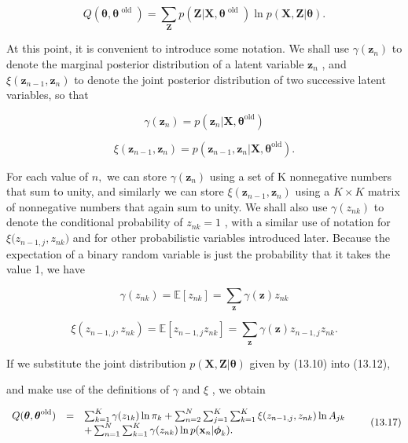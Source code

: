 \documentclass[
  10
]{article}
\begin{document}
\[
Q (\boldsymbol {\theta}, \boldsymbol {\theta} ^ {\text { old }}) = \sum_ {\mathbf {Z}} p (\mathbf {Z} | \mathbf {X}, \boldsymbol {\theta} ^ {\text { old }}) \ln p (\mathbf {X}, \mathbf {Z} | \boldsymbol {\theta}).\tag{13.12}
\]

At this point, it is convenient to introduce some notation. We shall use
\(\gamma ( \mathbf { z } _ { n } )\) to denote the marginal posterior
distribution of a latent variable \(\mathbf { z } _ { n }\) , and
\(\xi ( \mathbf { z } _ { n - 1 } , \mathbf { z } _ { n } )\) to denote
the joint posterior distribution of two successive latent variables, so
that

\[
{\gamma (\mathbf {z} _ {n})} = {p (\mathbf {z} _ {n} | \mathbf {X}, \pmb {\theta} ^ {\mathrm{old}})}\tag{13.13}
\]

\[
\xi (\mathbf {z} _ {n - 1}, \mathbf {z} _ {n}) = p (\mathbf {z} _ {n - 1}, \mathbf {z} _ {n} | \mathbf {X}, \boldsymbol {\theta} ^ {\mathrm{old}}).\tag{13.14}
\]

For each value of \(n ,\) we can store
\(\gamma ( \mathbf { z } _ { n } )\) using a set of K nonnegative
numbers that sum to unity, and similarly we can store
\(\xi ( \mathbf { z } _ { n - 1 } , \mathbf { z } _ { n } )\) using a
\(K \times K\) matrix of nonnegative numbers that again sum to unity. We
shall also use \(\gamma ( z _ { n k } )\) to denote the conditional
probability of \(z _ { n k } = 1\) , with a similar use of notation for
\(\xi \big ( z _ { n - 1 , j } , z _ { n k } \big )\) and for other
probabilistic variables introduced later. Because the expectation of a
binary random variable is just the probability that it takes the value
1, we have

\[
\gamma (z _ {n k}) = \mathbb {E} [ z _ {n k} ] = \sum_ {\mathbf {z}} \gamma (\mathbf {z}) z _ {n k}\tag{13.15}
\]

\[
\xi (z _ {n - 1, j}, z _ {n k}) = \mathbb {E} [ z _ {n - 1, j} z _ {n k} ] = \sum_ {\mathbf {z}} \gamma (\mathbf {z}) z _ {n - 1, j} z _ {n k}.\tag{13.16}
\]

If we substitute the joint distribution
\(p ( \mathbf { X } , \mathbf { Z } | \boldsymbol { \theta } )\) given
by (13.10) into (13.12),

and make use of the definitions of \(\gamma\) and \(\xi\) , we obtain

\[
\begin{array}{r c l} Q (\boldsymbol {\theta}, \boldsymbol {\theta} ^ {\text {old}}) & = & \sum_ {k = 1} ^ {K} \gamma (z _ {1 k}) \ln \pi_ {k} + \sum_ {n = 2} ^ {N} \sum_ {j = 1} ^ {K} \sum_ {k = 1} ^ {K} \xi (z _ {n - 1, j}, z _ {n k}) \ln A _ {j k} \\ & & + \sum_ {n = 1} ^ {N} \sum_ {k = 1} ^ {K} \gamma (z _ {n k}) \ln p (\mathbf {x} _ {n} | \boldsymbol {\phi} _ {k}). \end{array}\tag{13.17}
\]
\end{document}
